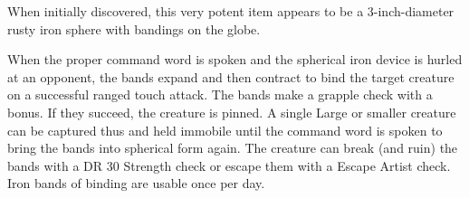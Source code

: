 {\begin{comment}
The fortress is deactivated by speaking a command word (different from the one used to activate it). It cannot be deactivated unless it is empty.

Strong conjuration; CL 13th; Craft Wondrous Item, mage's magnificent mansion; Price 55,000 gp.
\end{comment}

 When initially discovered, this very potent item appears to be a 3-inch-diameter rusty iron sphere with bandings on the globe.

When the proper command word is spoken and the spherical iron device is hurled at an opponent, the bands expand and then contract to bind the target creature on a successful ranged touch attack. The bands make a grapple check with a  bonus. If they succeed, the creature is pinned. A single Large or smaller creature can be captured thus and held immobile until the command word is spoken to bring the bands into spherical form again. The creature can break (and ruin) the bands with a DR 30 Strength check or escape them with a  Escape Artist check. Iron bands of binding are usable once per day.


\begin{comment}
Iron Flask} These special containers are typically inlaid with runes of silver and stoppered by a brass plug bearing a seal engraved with sigils, glyphs, and special symbols. When the user speaks the command word, he can force any creature from another plane into the container, provided that creature fails a DR 19 Will save. The range of this effect is 60 feet. Only one creature at a time can be so contained. Loosing the stopper frees the captured creature.

The command word can be given only once per day.

If the individual freeing the captured creature speaks the command word, the creature can be forced to serve for 1 hour. If freed without the command word, the creature acts according to its natural inclinations. (It usually attacks the user, unless it perceives a good reason not to.) Any attempt to force the same creature into the flask a second time provides it a \plus2 bonus on its saving throw and makes it hostile. A newly discovered bottle might contain any of the following:


\end{comment}}
